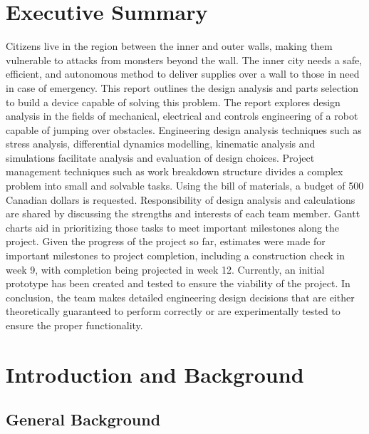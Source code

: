 \documentclass[ece]{uw-wkrpt}
\let\oldsection\section
\renewcommand\section{\clearpage\oldsection}
\begin{document}
\section{Executive Summary}\label{sec:summary}
Citizens live in the region between the inner and outer walls, making them vulnerable to attacks from monsters beyond the wall. The inner city needs a safe, efficient, and autonomous method to deliver supplies over a wall to those in need in case of emergency. This report outlines the design analysis and parts selection to build a device capable of solving this problem. The report explores design analysis in the fields of mechanical, electrical and controls engineering of a robot capable of jumping over obstacles. Engineering design analysis techniques such as stress analysis, differential dynamics modelling, kinematic analysis and simulations facilitate analysis and evaluation of design choices. Project management techniques such as work breakdown structure divides a complex problem into small and solvable tasks. Using the bill of materials, a budget of 500 Canadian dollars is requested. Responsibility of design analysis and calculations are shared by discussing the strengths and interests of each team member. Gantt charts aid in prioritizing those tasks to meet important milestones along the project. Given the progress of the project so far, estimates were made for important milestones to project completion, including a construction check in week 9, with completion being projected in week 12. Currently, an initial prototype has been created and tested to ensure the viability of the project. In conclusion, the team makes detailed engineering design decisions that are either theoretically guaranteed to perform correctly or are experimentally tested to ensure the proper functionality.

\tableofcontents
\listoffigures
\listoftables



\mainmatter

% 
\section{Introduction and Background}

\subsection{General Background}
\end{document}
